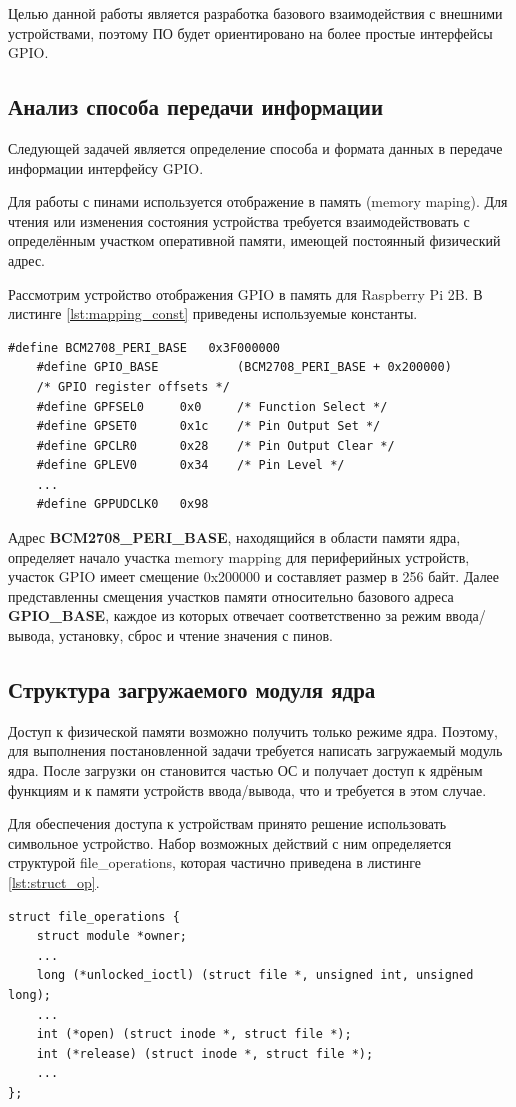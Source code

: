Целью данной работы является разработка базового взаимодействия с внешними устройствами, поэтому  ПО будет ориентировано на более простые интерфейсы GPIO.

\subsection{Анализ способа передачи информации}
Следующей задачей является определение способа и формата данных в передаче информации интерфейсу GPIO.

Для работы с пинами используется отображение в память (memory maping). Для чтения или изменения состояния устройства требуется взаимодействовать с определённым участком оперативной памяти, имеющей постоянный физический адрес. 

Рассмотрим устройство отображения GPIO в память для Raspberry Pi 2B. В листинге \ref{lst:mapping_const} приведены используемые константы\cite{subj:gpio_addr}.
\begin{lstlisting}[caption = {Адреса memmory\_mapping}, label=lst:mapping_const]
	#define BCM2708_PERI_BASE	0x3F000000
	#define GPIO_BASE           (BCM2708_PERI_BASE + 0x200000) 	
	/* GPIO register offsets */
	#define GPFSEL0		0x0		/* Function Select */
	#define GPSET0		0x1c	/* Pin Output Set */
	#define GPCLR0		0x28	/* Pin Output Clear */
	#define GPLEV0		0x34	/* Pin Level */
	...
	#define GPPUDCLK0	0x98
\end{lstlisting}

Адрес \textbf{BCM2708\_PERI\_BASE}, находящийся в области памяти ядра, определяет начало участка memory mapping для периферийных устройств, участок GPIO имеет смещение 0x200000 и составляет размер в 256 байт. Далее представленны смещения участков памяти относительно базового адреса \textbf{GPIO\_BASE}, каждое из которых отвечает соответственно за режим ввода/вывода, установку, сброс и чтение значения с пинов.


\subsection{Структура загружаемого модуля ядра}
Доступ к физической памяти возможно получить только режиме ядра. Поэтому, для выполнения постановленной задачи требуется написать загружаемый модуль ядра. После загрузки он становится частью ОС и получает доступ к ядрёным функциям и к памяти устройств ввода/вывода, что и требуется в этом случае. 

Для обеспечения доступа к устройствам принято решение использовать символьное устройство. Набор возможных действий с ним определяется структурой file\_operations, которая частично приведена в листинге \ref{lst:struct_op}.
\begin{lstlisting}[caption = {Структура file\_operations}, label=lst:struct_op]
struct file_operations {
	struct module *owner;
	...
	long (*unlocked_ioctl) (struct file *, unsigned int, unsigned long);
	...
	int (*open) (struct inode *, struct file *);
	int (*release) (struct inode *, struct file *);
	...
};
\end{lstlisting}

